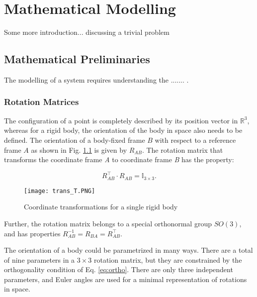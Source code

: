
\chapter{Mathematical Modelling} %

\label{Chapter2} %


Some more introduction... discussing a trivial problem    
\section{Mathematical Preliminaries}

The modelling of a system requires understanding the ....... \citep{craig2009introduction}.  

\subsection{Rotation Matrices}
The configuration of a point is completely described by its position vector in $\mathbb{R}^3$, whereas for a rigid body, the orientation of the body in space also needs to be defined.
The orientation of a body-fixed frame $B$ with respect to a reference frame $A$ as shown in Fig. \ref{fig:trans} is given by $R_{AB}$. The rotation matrix that transforms the coordinate frame \textit{A} to coordinate frame \textit{B} has the property:

\begin{equation}\label{eq:ortho}
R_{AB}^{\intercal}\cdot R_{AB} = \mathbb{I}_{3\times 3}.
\end{equation}

\begin{figure}[!htb]
    \centering
    \texttt{[image: trans\_T.PNG]}
    \caption{ Coordinate transformations for a single rigid body}
    \label{fig:trans}
\end{figure}

Further, the rotation matrix belongs to a special orthonormal group $SO(3)$, and has properties $R_{AB}^{-1} = R_{BA} = R_{AB}^{\intercal}$.

The orientation of a body could be parametrized in many ways. There are a total of nine parameters in a $3 \times 3$ rotation matrix, but they are constrained by the orthogonality condition of Eq. \ref{eq:ortho}. There are only three independent parameters, and Euler angles are used for a minimal representation of rotations in space.

